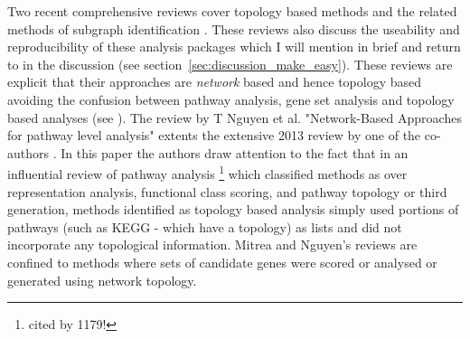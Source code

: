 Two recent comprehensive reviews cover topology based methods \cite{nguyen2018network} and the related methods of subgraph identification \cite{nguyen2019comprehensive}. These reviews also  discuss the useability and reproducibility of these analysis packages which I will mention in brief and return to in the discussion (see section~\ref{sec:discussion_make_easy}). These reviews are explicit that their approaches are \textit{network} based and hence topology based avoiding the confusion between pathway analysis, gene set analysis and topology based analyses (see \cite{mitrea2013methods}). The review by T Nguyen et al. "Network-Based Approaches for pathway level analysis" \cite{nguyen2018network} extents the extensive 2013 review by one of the co-authors \cite{mitrea2013methods}. In this paper \cite{mitrea2013methods} the authors draw attention to the fact that in an influential review of pathway analysis  \cite{khatri2012ten}\footnote{cited by 1179!} which classified methods as  over representation analysis, functional class scoring, and pathway topology or third generation, methods  identified as topology based analysis simply used portions of pathways (such as KEGG\cite{kanehisa2000kegg} - which have a topology) as lists and did not incorporate any topological information.  Mitrea\cite{mitrea2013methods} and Nguyen's reviews \cite{nguyen2018network} are confined to methods where sets of candidate genes were scored or analysed or generated using network topology.


